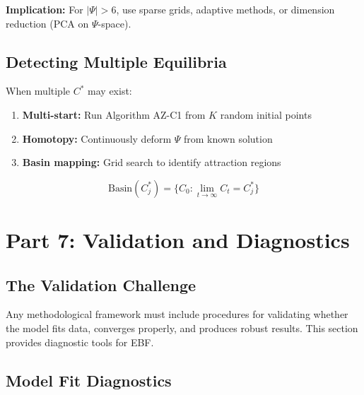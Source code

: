 \textbf{Implication:} For $|\Psi| > 6$, use sparse grids, adaptive methods,
or dimension reduction (PCA on $\Psi$-space).

\subsection{Detecting Multiple Equilibria}

When multiple $C^*$ may exist:

\begin{enumerate}
\item \textbf{Multi-start:} Run Algorithm AZ-C1 from $K$ random initial points
\item \textbf{Homotopy:} Continuously deform $\Psi$ from known solution
\item \textbf{Basin mapping:} Grid search to identify attraction regions
\end{enumerate}

\begin{equation}
\text{Basin}(C^*_j) = \{C_0 : \lim_{t \to \infty} C_t = C^*_j\}
\end{equation}


\section{Part 7: Validation and Diagnostics}
\label{sec:az-validation}

\subsection{The Validation Challenge}

Any methodological framework must include procedures for validating whether the
model fits data, converges properly, and produces robust results. This section
provides diagnostic tools for EBF.

\subsection{Model Fit Diagnostics}


